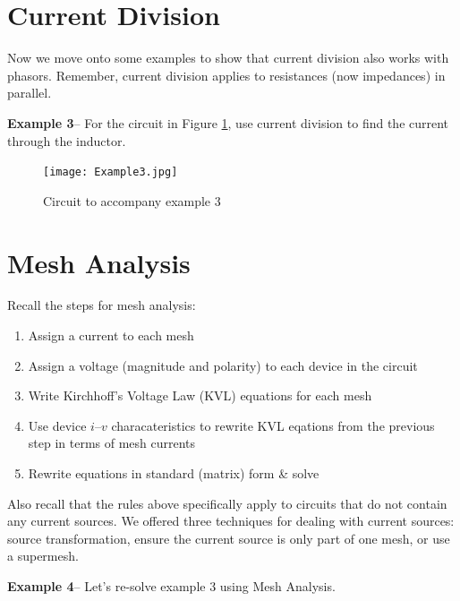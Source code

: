\documentclass{handout}
\begin{document}
\newpage
\clearpage
\pagebreak

\section{Current Division}
Now we move onto some examples to show that current division also works with phasors.  Remember, current division applies to resistances (now impedances) in parallel.

\textbf{Example 3}-- For the circuit in Figure \ref{fig: Example3}, use current division to find the current through the inductor.
\begin{figure} [h!]
\centering
\texttt{[image: Example3.jpg]}
\caption{Circuit to accompany example 3}
\label{fig: Example3}
\end{figure}


\newpage
\clearpage
\pagebreak

\section{Mesh Analysis}
Recall the steps for mesh analysis:
\begin{enumerate}
\item Assign a current to each mesh
\item Assign a voltage (magnitude and polarity) to each device in the circuit
\item Write Kirchhoff's Voltage Law (KVL) equations for each mesh
\item Use device $i$--$v$ characateristics to rewrite KVL eqations from the previous step in terms of mesh currents
\item Rewrite equations in standard (matrix) form \& solve
\end{enumerate}

Also recall that the rules above specifically apply to circuits that do not contain any current sources.  We offered three techniques for dealing with current sources: source transformation, ensure the current source is only part of one mesh,  or use a supermesh.

\textbf{Example 4}-- Let's re-solve example 3 using Mesh Analysis.
\end{document}
